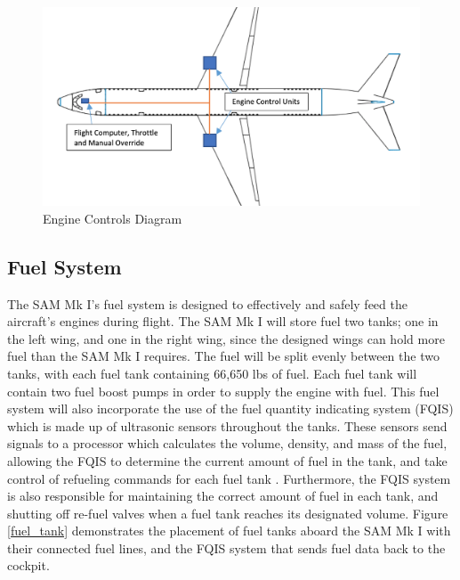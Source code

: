 \begin{figure}[H]
    \centering
    \includegraphics[width=.85\linewidth]{Photos/systems/engine_controls.png}
    \caption{Engine Controls Diagram}
    \label{engine_controls}
\end{figure}

\subsection{Fuel System}
The SAM Mk I’s fuel system is designed to effectively and safely feed the aircraft’s engines during flight. The SAM Mk I will store fuel two tanks; one in the left wing, and one in the right wing, since the designed wings can hold more fuel than the SAM Mk I requires. The fuel will be split evenly between the two tanks, with each fuel tank containing 66,650 lbs of fuel. Each fuel tank will contain two fuel boost pumps in order to supply the engine with fuel. This fuel system will also incorporate the use of the fuel quantity indicating system (FQIS) which is made up of ultrasonic sensors throughout the tanks. These sensors send signals to a processor which calculates the volume, density, and mass of the fuel, allowing the FQIS to determine the current amount of fuel in the tank, and take control of refueling commands for each fuel tank \cite{fuel_system}. Furthermore, the FQIS system is also responsible for maintaining the correct amount of fuel in each tank, and shutting off re-fuel valves when a fuel tank reaches its designated volume. Figure \ref{fuel_tank} demonstrates the placement of fuel tanks aboard the SAM Mk I with their connected fuel lines, and the FQIS system that sends fuel data back to the cockpit.


